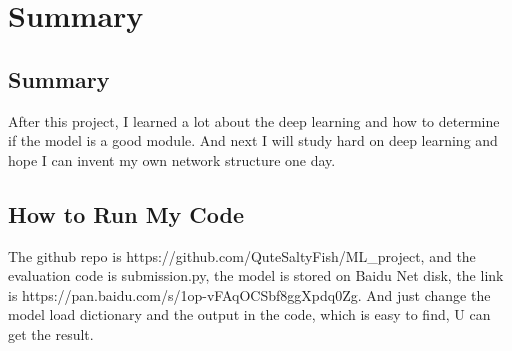 \chapter{Summary}
\label{chap:Summary}

\section{Summary}

 After this project, I learned a lot about the deep learning and how to determine if the model is a good module. And next I will study hard on deep learning and hope I can invent my own network structure one day.

 \section{How to Run My Code}

 The github repo is https://github.com/QuteSaltyFish/ML_project, and the evaluation code is submission.py, the model is stored on Baidu Net disk, the link is https://pan.baidu.com/s/1op-vFAqOCSbf8ggXpdq0Zg. And just change the model load dictionary and the output in the code, which is easy to find, U can get the result.